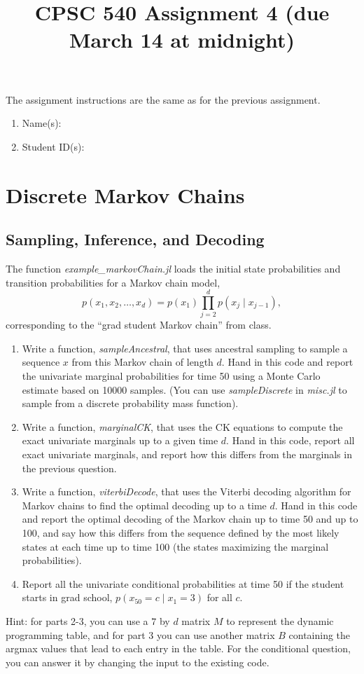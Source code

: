 \documentclass{article}
\def\blu#1{{\color{blu}#1}}
\def\cond{\; | \;}
\def\enum#1{\begin{enumerate}#1\end{enumerate}}
\begin{document}
\title{CPSC 540 Assignment 4 (due March 14 at midnight)}
\author{}
\date{}
\maketitle
\vspace{-4em}


The assignment instructions are the same as for the previous assignment.


\blu{\enum{
\item Name(s):
\item Student ID(s):
}}



\section{Discrete Markov Chains}

\subsection{Sampling, Inference, and Decoding}

The function \emph{example\_markovChain.jl} loads the initial state probabilities and transition probabilities for a Markov chain model,
\[
p(x_1,x_2,\dots,x_d) = p(x_1)\prod_{j=2}^{d}{p(x_j\cond x_{j-1})},
\]
corresponding to the ``grad student Markov chain'' from class.

\enum{
\item Write a function, \emph{sampleAncestral}, that uses ancestral sampling to sample a sequence $x$ from this Markov chain of length $d$. \blu{Hand in this code and report the univariate marginal probabilities for time 50 using a Monte Carlo estimate based on 10000 samples.} (You can use \emph{sampleDiscrete} in \emph{misc.jl} to sample from a discrete probability mass function).
\item Write a function, \emph{marginalCK}, that uses the CK equations to compute the exact univariate marginals up to a given time $d$. \blu{Hand in this code, report all exact univariate marginals, and report how this differs from the marginals in the previous question.}
\item Write a function, \emph{viterbiDecode}, that uses the Viterbi decoding algorithm for Markov chains to find the optimal decoding up to a time $d$. \blu{Hand in this code and report the optimal decoding of the Markov chain up to time 50 and up to 100, and say how this differs from the sequence defined by the most likely states at each time up to time 100 (the states maximizing the marginal probabilities)}.
\item \blu{Report all the univariate conditional probabilities at time 50 if the student starts in grad school, $p(x_{50} = c \cond  x_1 = 3)$ for all $c$}.
}
Hint: for parts 2-3, you can use a $7$ by $d$ matrix $M$ to represent the dynamic programming table, and for part 3 you can use another matrix $B$ containing the argmax values that lead to each entry in the table.  For the conditional question, you can answer it by changing the input to the existing code.
\end{document}
